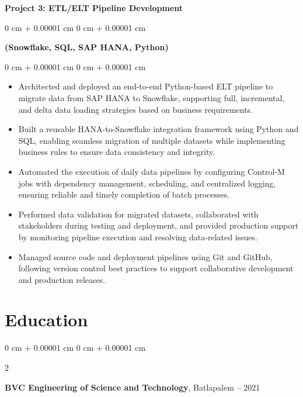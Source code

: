 \documentclass[10pt, letterpaper]{article}
\newenvironment{highlights}{
    \begin{itemize}[
        topsep=0.10 cm,
        parsep=0.10 cm,
        partopsep=0pt,
        itemsep=0pt,
        leftmargin=0 cm + 10pt
    ]
}{
    \end{itemize}
} %
\newenvironment{onecolentry}{
    \begin{adjustwidth}{
        0 cm + 0.00001 cm
    }{
        0 cm + 0.00001 cm
    }
}{
    \end{adjustwidth}
} %
\newenvironment{twocolentry}[2][]{
    \onecolentry
    \def\secondColumn{#2}
    \setcolumnwidth{\fill, 4.5 cm}
    \begin{paracol}{2}
}{
    \switchcolumn \raggedleft \secondColumn
    \end{paracol}
    \endonecolentry
} %
\begin{document}
        \vspace{0.30 cm}
        \textbf{Project 3: ETL/ELT Pipeline Development}
        \begin{onecolentry}
        \vspace{0.15 cm}
        \textbf{(Snowflake, SQL, SAP HANA, Python)}

        \end{onecolentry}
        \vspace{0.35 cm}
        \begin{onecolentry}
            \begin{highlights}
\item Architected and deployed an end-to-end Python-based ELT pipeline to migrate data from SAP HANA to Snowflake, supporting full, incremental, and delta data loading strategies based on business requirements.
\item Built a reusable HANA-to-Snowflake integration framework using Python and SQL, enabling seamless migration of multiple datasets while implementing business rules to ensure data consistency and integrity.
\item Automated the execution of daily data pipelines by configuring Control-M jobs with dependency management, scheduling, and centralized logging, ensuring reliable and timely completion of batch processes.
\item Performed data validation for migrated datasets, collaborated with stakeholders during testing and deployment, and provided production support by monitoring pipeline execution and resolving data-related issues.
\item Managed source code and deployment pipelines using Git and GitHub, following version control best practices to support collaborative development and production releases.




            \end{highlights}
        \end{onecolentry}
        \vspace{0.4 cm}

    \section{Education}



        
        \begin{twocolentry}{
            2018 – 2021
        }
            \textbf{BVC Engineering of Science and Technology}, Batlapalem\end{twocolentry}
\end{document}
